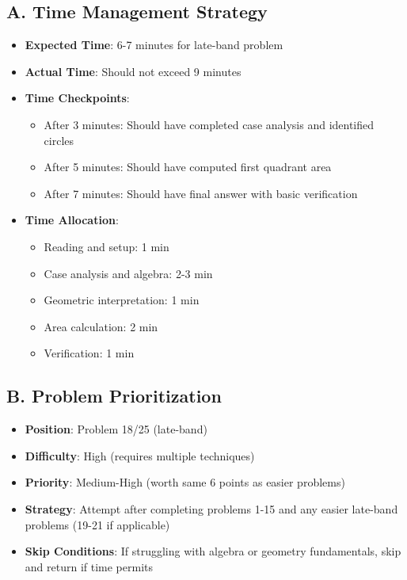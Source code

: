 \documentclass[]{article}
\begin{document}
\begin{competitionbox}
\subsection*{A. Time Management Strategy}
\begin{itemize}[leftmargin=*]
    \item \textbf{Expected Time}: 6-7 minutes for late-band problem
    \item \textbf{Actual Time}: Should not exceed 9 minutes
    \item \textbf{Time Checkpoints}:
    \begin{itemize}
        \item After 3 minutes: Should have completed case analysis and identified circles
        \item After 5 minutes: Should have computed first quadrant area
        \item After 7 minutes: Should have final answer with basic verification
    \end{itemize}
    \item \textbf{Time Allocation}:
    \begin{itemize}
        \item Reading and setup: 1 min
        \item Case analysis and algebra: 2-3 min
        \item Geometric interpretation: 1 min
        \item Area calculation: 2 min
        \item Verification: 1 min
    \end{itemize}
\end{itemize}

\subsection*{B. Problem Prioritization}
\begin{itemize}[leftmargin=*]
    \item \textbf{Position}: Problem 18/25 (late-band)
    \item \textbf{Difficulty}: High (requires multiple techniques)
    \item \textbf{Priority}: Medium-High (worth same 6 points as easier problems)
    \item \textbf{Strategy}: Attempt after completing problems 1-15 and any easier late-band problems (19-21 if applicable)
    \item \textbf{Skip Conditions}: If struggling with algebra or geometry fundamentals, skip and return if time permits
\end{itemize}


\end{competitionbox}
\end{document}
